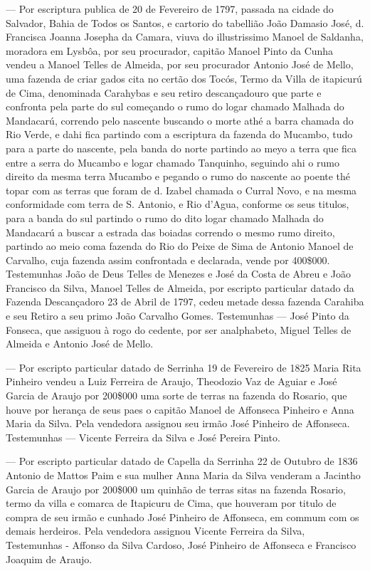 — Por escriptura publica de 20 de Fevereiro de 1797, passada na cidade do Salvador, Bahia de Todos os Santos, e cartorio do tabellião João Damasio José, d. Francisca Joanna Josepha da Camara, viuva do illustrissimo Manoel de Saldanha, moradora em Lysbôa, por seu procurador, capitão Manoel Pinto da Cunha vendeu a Manoel Telles de Almeida, por seu procurador Antonio José de Mello, uma fazenda de criar gados cita no certão dos Tocós, Termo da Villa de itapicurú de Cima, denominada Carahybas e seu retiro descançadouro que parte e confronta pela parte do sul começando o rumo do logar chamado Malhada do Mandacarú, correndo pelo nascente buscando o morte athé a barra chamada do Rio Verde, e dahi fica partindo com a escriptura da fazenda do Mucambo, tudo para a parte do nascente, pela banda do norte partindo ao meyo a terra que fica entre a serra do Mucambo e logar chamado Tanquinho, seguindo ahi o rumo direito da mesma terra Mucambo e pegando o rumo do nascente ao poente thé topar com as terras que foram de d. Izabel chamada o Curral Novo, e na mesma conformidade com terra de S. Antonio, e Rio d'Agua, conforme os seus titulos, para a banda do sul partindo o rumo do dito logar chamado Malhada do Mandacarú a buscar a estrada das boiadas correndo o mesmo rumo direito, partindo ao meio coma fazenda do Rio do Peixe de Sima de Antonio Manoel de Carvalho, cuja fazenda assim confrontada e declarada, vende por 400\$000. Testemunhas João de Deus Telles de Menezes e José da Costa de Abreu e João Francisco da Silva, Manoel Telles de Almeida, por escripto particular datado da Fazenda Descançadoro 23 de Abril de 1797, cedeu metade dessa fazenda Carahiba e seu Retiro a seu primo João Carvalho Gomes. Testemunhas — José Pinto da Fonseca, que assiguou à rogo do cedente, por ser analphabeto, Miguel Telles de Almeida e Antonio José de Mello.

— Por escripto particular datado de Serrinha 19 de Fevereiro de 1825 Maria Rita Pinheiro vendeu a Luiz Ferreira de Araujo, Theodozio Vaz de Aguiar e José Garcia de Araujo por 200\$000 uma sorte de terras na fazenda do Rosario, que houve por herança de seus paes o capitão Manoel de Affonseca Pinheiro e Anna Maria da Silva. Pela vendedora assignou seu irmão José Pinheiro de Affonseca. Testemunhas — Vicente Ferreira da Silva e José Pereira Pinto.

— Por escripto particular datado de Capella da Serrinha 22 de Outubro de 1836 Antonio de Mattos Paim e sua mulher Anna Maria da Silva venderam a Jacintho Garcia de Araujo por 200\$000 um quinhão de terras sitas na fazenda Rosario,
termo da villa e comarca de Itapicuru de Cima, que houveram por titulo de compra de seu irmão e cunhado José Pinheiro de Affonseca, em commum com os demais herdeiros. Pela vendedora assignou Vicente Ferreira da Silva, Testemunhas - Affonso da Silva Cardoso, José Pinheiro de Affonseca e Francisco Joaquim de Araujo.




